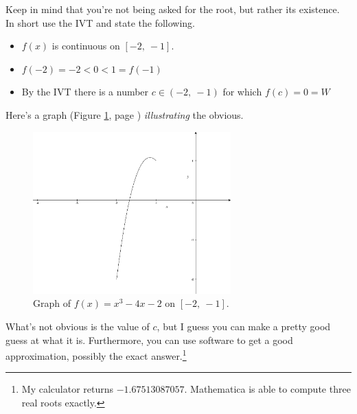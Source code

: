 \documentclass[12pt,addpoints, answers, fleqn]{exam}
\begin{document}
\begin{solution}
Keep in mind that you're not being asked for the root, but rather its existence. In short use the IVT and state the following.
\begin{itemize}
\item $f \left( x \right)$ is continuous on $\left[ -2, \ -1 \right]$.
\item $f \left( -2 \right) = -2 < 0 < 1 = f \left( -1 \right)$
\item By the IVT there is a number $c \in \left( -2, \ -1 \right)$ for which $f \left(c\right) = 0 = W$
\end{itemize}
Here's a graph (Figure \ref{fig:graph0803}, page \pageref{fig:graph0803}) \emph{illustrating} the obvious.
\end{solution}
\begin{figure}[htbp] %
   \centering
   \includegraphics[width=3in]{./graphics/graph0803.pdf} 
   \caption{Graph of $f \left( x \right)= x^3 - 4x - 2$ on $\left[ -2, \ -1 \right]$.}
   \label{fig:graph0803}
\end{figure}
What's not obvious is the value of $c$, but I guess you can make a pretty good guess at what it is. Furthermore, you can use software to get a good approximation, possibly the exact answer.\footnote{My calculator returns $-1.67513087057$. Mathematica is able to compute three real roots exactly.}
\end{document}
